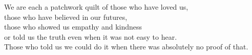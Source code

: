 \begin{dedication} 
We are each a patchwork quilt of those who have loved us, \\those who have believed in our futures, \\those who showed us empathy and kindness \\or told us the truth even when it was not easy to hear. 
\\Those who told us we could do it when there was absolutely no proof of that. 



\end{dedication}
